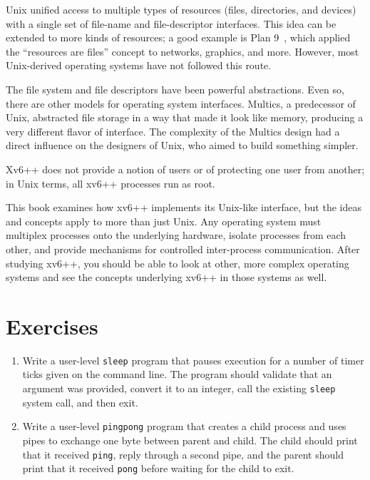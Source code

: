 Unix unified access to multiple types of resources (files,
directories, and devices) with a single set of
file-name and file-descriptor interfaces.
This idea can be extended to more kinds of resources;
a good example is Plan 9~\cite{Presotto91plan9},
which applied the ``resources are files''
concept to
networks, graphics, and more.
However, most Unix-derived operating systems have
not followed this route.

The file system and file descriptors have been powerful
abstractions.
Even so, there are other models for operating system interfaces.
Multics, a predecessor of Unix,
abstracted file storage in a way that made it look like memory,
producing a very different flavor of interface.
The complexity of the Multics design had a direct influence
on the designers of Unix, who aimed to build something simpler.

Xv6++ does not provide a notion of users or of protecting
one user from another; in Unix terms, all xv6++ processes
run as root.

This book examines how xv6++ implements its Unix-like interface,
but the ideas and concepts apply to more than just Unix.
Any operating system must multiplex processes onto
the underlying hardware, isolate processes from each
other, and provide mechanisms for controlled
inter-process communication.
After studying xv6++, you should be able to
look at other, more complex operating systems
and see the concepts underlying xv6++ in those systems as well.

\section{Exercises}

\begin{enumerate}

\item Write a user-level \texttt{sleep} program that pauses
execution for a number of timer ticks given on the command line.
The program should validate that an argument was provided, convert
it to an integer, call the existing \texttt{sleep} system call, and
then exit.

\item Write a user-level \texttt{pingpong} program that creates a
child process and uses pipes to exchange one byte between parent and
child. The child should print that it received \texttt{ping}, reply
through a second pipe, and the parent should print that it received
\texttt{pong} before waiting for the child to exit.

\end{enumerate}
